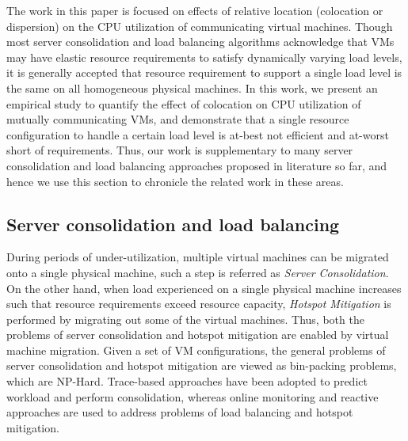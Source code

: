 
The work in this paper is focused on effects of relative location
(colocation or dispersion) on the CPU utilization of communicating virtual
machines. 
Though most server consolidation and load balancing algorithms 
\cite{capacity-management, sandpiper, autonomic-vm-placement} acknowledge
that VMs may have elastic resource requirements to satisfy dynamically
varying load levels, it is generally accepted that resource requirement
to support a single load level is the same on all homogeneous physical 
machines. In this work, we present an empirical study to quantify the effect 
of colocation on CPU utilization of mutually communicating VMs, and 
demonstrate that a single resource configuration to handle a certain 
load level is at-best not efficient and at-worst short of requirements.
Thus, our work is supplementary to many server consolidation and load 
balancing approaches proposed in literature so far, and hence we use 
this section to chronicle the related work in these areas.

\subsection{Server consolidation and load balancing} 
During periods of under-utilization, multiple virtual machines can
be migrated onto a single physical machine, such a step is referred
as \textit{Server Consolidation}. On the other hand, when load
experienced on a single physical machine increases such that resource
requirements exceed resource capacity, \textit{Hotspot Mitigation} is
performed by migrating out some of the virtual machines.
Thus, both the problems of server consolidation and hotspot mitigation are
enabled by virtual machine migration.
Given a set of VM configurations, the general problems of server consolidation
and hotspot mitigation are viewed as bin-packing problems, which are NP-Hard. 
Trace-based approaches \cite{capacity-management} have been adopted to 
predict workload and perform consolidation, whereas online monitoring
and reactive approaches \cite{sandpiper, autonomic-vm-placement} are used
to address problems of load balancing and hotspot mitigation. 

